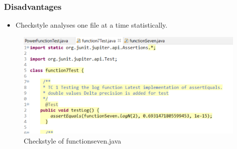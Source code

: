 \documentclass{article}
\begin{document}
    \subsubsection*{Disadvantages}
    \begin{itemize}
        \item Checkstyle analyses one file at a time statistically.
    \end{itemize}
    \newline
\begin{figure}[htb]
    \centering
    \includegraphics{checklist}
    \caption{Checkstyle of functionseven.java}
    \label{fig:galaxy}
\end{figure}
\pagebreak
\newpage
{}
\section*{}
\end{document}
